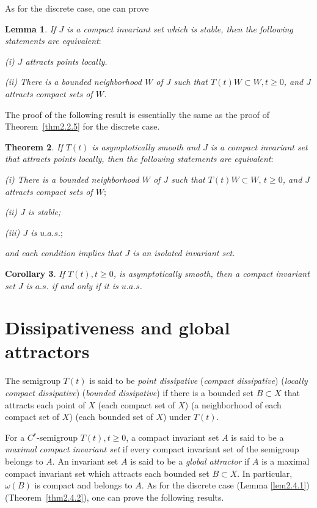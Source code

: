\documentclass{surv-l}
\theoremstyle{plain}
\newtheorem{theorem}{Theorem}[section]
\newtheorem{corollary}[theorem]{Corollary}
\newtheorem{lemma}[theorem]{Lemma}
\theoremstyle{definition}
\numberwithin{equation}{section}
\numberwithin{figure}{chapter}
\begin{document}
As for the discrete case, one can prove

\begin{lemma}\label{lem3.3.1} If $J$ is a compact invariant set which is stable, then the following statements are equivalent$:$

\emph{(i)} $J$ attracts points locally.

\emph{(ii)} There is a bounded neighborhood $W$ of $J$ such that $T(t)W\subset W, t\geq 0$, and $J$ attracts compact sets of $W$.
\end{lemma}

The proof of the following result is essentially the same as the proof of Theorem~\ref{thm2.2.5} for the discrete case.

\begin{theorem}\label{thm3.3.2} If $T(t)$ is asymptotically smooth and $J$ is a compact invariant set that attracts points locally, then the following statements are equivalent$:$

\emph{(i)} There is a bounded neighborhood $W$ of $J$ such that $T(t)W\subset W,\, t\geq 0$, and $J$ attracts compact sets of $W;$

\emph{(ii)} $J$ is stable;

\emph{(iii)} $J$ is $u.a.s.;$

and each condition implies that $J$ is an isolated invariant set.
\end{theorem}
\setcounter{theorem}{3}
\begin{corollary}\label{cor3.3.4} If $T(t), t\geq 0$, is asymptotically smooth, then a compact invariant set $J$ is $a.s$. if and only if it is $u.a.s$.
\end{corollary}

\section{Dissipativeness and global attractors}\label{sec3.4}

The semigroup $T(t)$ is said to be \emph{point dissipative} (\emph{compact dissipative}) (\emph{locally compact dissipative}) (\emph{bounded dissipative}) if there is a bounded set $B\subset X$ that attracts each point of $X$ (each compact set of $X$) (a neighborhood of each compact set of $X$) (each bounded set of $X$) under $T(t)$.

For a $C^{r}$-semigroup $T(t), t\geq 0$, a compact invariant set $A$ is said to be a \emph{maximal compact invariant set} if every compact invariant set of the semigroup belongs to $A$. An invariant set $A$ is said to be a \emph{global attractor} if $A$ is a maximal compact invariant set which attracts each bounded set $B\subset X$. In particular, $\omega(B)$ is compact and belongs to $A$. As for the discrete case (Lemma \ref{lem2.4.1}) (Theorem~\ref{thm2.4.2}), one can prove the following results.
\end{document}
